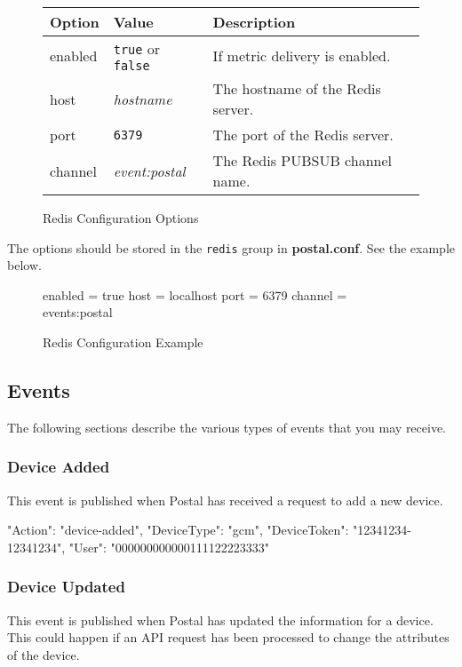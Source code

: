 \documentclass[12pt]{article}
\newcommand{\file}[1]{{\bf\ttfamily #1}}
\begin{document}
\begin{figure}[h!]
\centering
\begin{tabular}{l l l}
\hline
Option & Value & Description \\
\hline
enabled & \verb|true| or \verb|false| & If metric delivery is enabled. \\
host & \emph{hostname} & The hostname of the Redis server. \\
port & \verb|6379| & The port of the Redis server. \\
channel & \emph{event:postal} & The Redis PUBSUB channel name. \\
\hline
\end{tabular}
\caption{Redis Configuration Options}
\end{figure}

The options should be stored in the \verb|redis| group in \file{postal.conf}.
See the example below.

\begin{figure}[h!]
\begin{Terminal}
[redis]
enabled = true
host = localhost
port = 6379
channel = events:postal
\end{Terminal}
\caption{Redis Configuration Example}
\end{figure}

\subsection{Events}

The following sections describe the various types of events that you may receive.

\subsubsection{Device Added}

This event is published when Postal has received a request to add a new device.

\begin{Terminal}
{
  "Action": "device-added",
  "DeviceType": "gcm",
  "DeviceToken": "12341234-12341234",
  "User": "000000000000111122223333"
}
\end{Terminal}

\subsubsection{Device Updated}

This event is published when Postal has updated the information for a device.
This could happen if an API request has been processed to change the attributes of the device.
\end{document}
